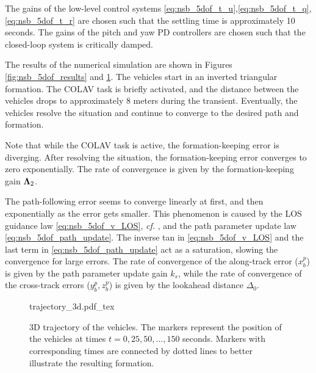 The gains of the low-level control systems \eqref{eq:nsb_5dof_t_u},\eqref{eq:nsb_5dof_t_q},\eqref{eq:nsb_5dof_t_r} are chosen such that the settling time is approximately 10 seconds.
The gains of the pitch and yaw PD controllers are chosen such that the closed-loop system is critically damped.

The results of the numerical simulation are shown in Figures \ref{fig:nsb_5dof_results} and \ref{fig:nsb_5dof_trajectory}.
The vehicles start in an inverted triangular formation.
The COLAV task is briefly activated, and the distance between the vehicles drops to approximately 8 meters during the transient.
Eventually, the vehicles resolve the situation and continue to converge to the desired path and formation.

Note that while the COLAV task is active, the formation-keeping error is diverging.
After resolving the situation, the formation-keeping error converges to zero exponentially.
The rate of convergence is given by the formation-keeping gain $\bm{\Lambda}_2$.

The path-following error seems to converge linearly at first, and then exponentially as the error gets smaller.
This phenomenon is caused by the LOS guidance law \eqref{eq:nsb_5dof_v_LOS}, \emph{cf.} \cite{fossen_uniform_2014}, and the path parameter update law \eqref{eq:nsb_5dof_path_update}.
The inverse tan in \eqref{eq:nsb_5dof_v_LOS} and the last term in \eqref{eq:nsb_5dof_path_update} act as a saturation, slowing the convergence for large errors.
The rate of convergence of the along-track error ($x_b^p$) is given by the path parameter update gain $k_{s}$, while the rate of convergence of the cross-track errors ($y_b^p, z_b^p$) is given by the lookahead distance $\Delta_0$.

\begin{figure}[t]
    \centering
    \def\svgwidth{.8\textwidth}
    {trajectory_3d.pdf_tex}
    \caption{3D trajectory of the vehicles. The markers represent the position of the vehicles at times $t = 0, 25, 50, \ldots, 150$ seconds. Markers with corresponding times are connected by dotted lines to better illustrate the resulting formation.}
    \label{fig:nsb_5dof_trajectory}
\end{figure}

